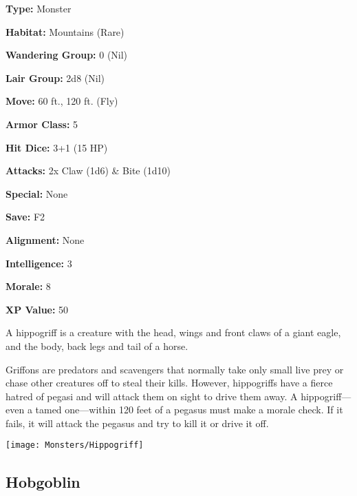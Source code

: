 \begin{multicols*}{2}
{\textbf{Type:} Monster

\textbf{Habitat:} Mountains (Rare)

\textbf{Wandering Group:} 0 (Nil)

\textbf{Lair Group:} 2d8 (Nil)

\textbf{Move:} 60 ft., 120 ft. (Fly)

\textbf{Armor Class:} 5

\textbf{Hit Dice:} 3+1 (15 HP)

\textbf{Attacks:} 2x Claw (1d6) \& Bite (1d10)

\textbf{Special:} None

\textbf{Save:} F2

\textbf{Alignment:} None

\textbf{Intelligence:} 3

\textbf{Morale:} 8

\textbf{XP Value:} 50}

A hippogriff is a creature with the head, wings and front claws of a giant eagle, and the body, back legs and tail of a horse.

Griffons are predators and scavengers that normally take only small live prey or chase other creatures off to steal their kills. However, hippogriffs have a fierce hatred of pegasi and will attack them on sight to drive them away. A hippogriff—even a tamed one—within 120 feet of a pegasus must make a morale check. If it fails, it will attack the pegasus and try to kill it or drive it off.

\texttt{[image: Monsters/Hippogriff]}

\subsection{Hobgoblin}
\end{multicols*}
